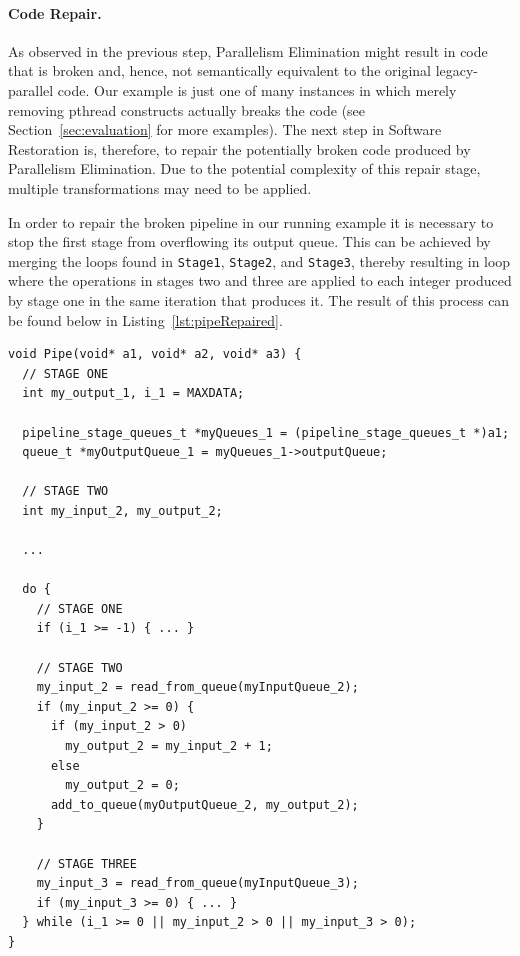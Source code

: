 \paragraph{Code Repair.}
As observed in the previous step, Parallelism Elimination might result in code that is broken and, hence, not semantically equivalent to the original legacy-parallel code.
%
Our example is just one of many instances in which merely removing pthread constructs actually breaks the code (see Section~\ref{sec:evaluation} for more examples). The next step in Software Restoration is, therefore, to repair the potentially broken code produced by Parallelism Elimination. Due to the potential complexity of this repair stage, multiple transformations may need to be applied.
%

In order to repair the broken pipeline in our running example it is necessary to stop the first stage from overflowing its output queue. This can be achieved by merging the loops found in \lstinline|Stage1|, \lstinline|Stage2|, and \lstinline|Stage3|, thereby resulting in loop where the operations in stages two and three are applied to each integer produced by stage one in the same iteration that produces it. The result of this process can be found below in Listing~\ref{lst:pipeRepaired}.



\begin{lstlisting}[caption=Simple Pipeline Code after Code Repair, frame=single, label=lst:pipeRepaired]
void Pipe(void* a1, void* a2, void* a3) {
  // STAGE ONE
  int my_output_1, i_1 = MAXDATA;
  
  pipeline_stage_queues_t *myQueues_1 = (pipeline_stage_queues_t *)a1;
  queue_t *myOutputQueue_1 = myQueues_1->outputQueue;

  // STAGE TWO
  int my_input_2, my_output_2;

  ...

  do {
    // STAGE ONE
    if (i_1 >= -1) { ... }

    // STAGE TWO
    my_input_2 = read_from_queue(myInputQueue_2);
    if (my_input_2 >= 0) {
      if (my_input_2 > 0)
        my_output_2 = my_input_2 + 1;
      else
        my_output_2 = 0;
      add_to_queue(myOutputQueue_2, my_output_2);
    }

    // STAGE THREE
    my_input_3 = read_from_queue(myInputQueue_3);
    if (my_input_3 >= 0) { ... }
  } while (i_1 >= 0 || my_input_2 > 0 || my_input_3 > 0);
}
\end{lstlisting}

